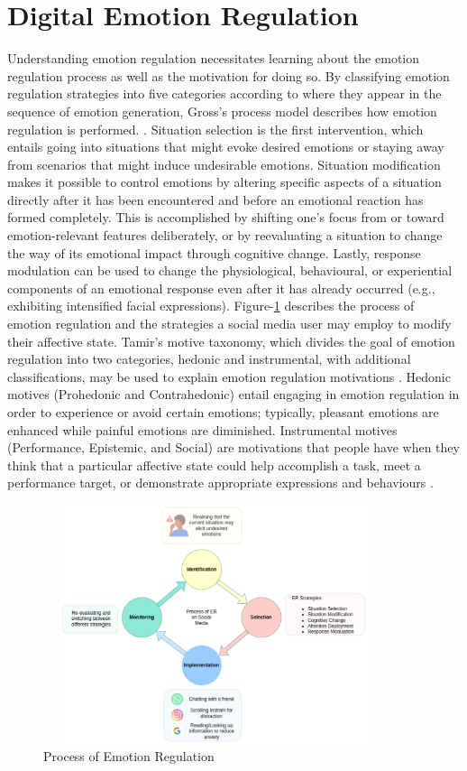 \documentclass[lettersize,journal]{IEEEtran}
\begin{document}
\section{Digital Emotion Regulation}
Understanding emotion regulation necessitates learning about the emotion regulation process as well as the motivation for doing so. By classifying emotion regulation strategies into five categories according to where they appear in the sequence of emotion generation, Gross's process model describes how emotion regulation is performed. \cite{wadley2020digital}. Situation selection is the first intervention, which entails going into situations that might evoke desired emotions or staying away from scenarios that might induce undesirable emotions. Situation modification makes it possible to control emotions by altering specific aspects of a situation directly after it has been encountered and before an emotional reaction has formed completely. This is accomplished by shifting one's focus from or toward emotion-relevant features deliberately, or by reevaluating a situation to change the way of its emotional impact through cognitive change. Lastly, response modulation can be used to change the physiological, behavioural, or experiential components of an emotional response even after it has already occurred (e.g., exhibiting intensified facial expressions).  Figure-\ref{fig:Process} describes the process of emotion regulation and the strategies a social media user may employ to modify their affective state. Tamir's motive taxonomy, which divides the goal of emotion regulation into two categories, hedonic and instrumental, with additional classifications, may be used to explain emotion regulation motivations \cite{wadley2020digital}. Hedonic motives (Prohedonic and Contrahedonic) entail engaging in emotion regulation in order to experience or avoid certain emotions; typically, pleasant emotions are enhanced while painful emotions are diminished. Instrumental motives (Performance, Epistemic, and Social) are motivations that people have when they think that a particular affective state could help accomplish a task, meet a performance target, or demonstrate appropriate expressions and behaviours \cite{wadley2020digital}.
\begin{figure}[h]
  
    \centering
    \includegraphics[width=10cm,height=7cm,keepaspectratio]{ERProcess.pdf}
  \caption{Process of Emotion Regulation}
  \label{fig:Process}
  \end{figure}
  
\end{document}
